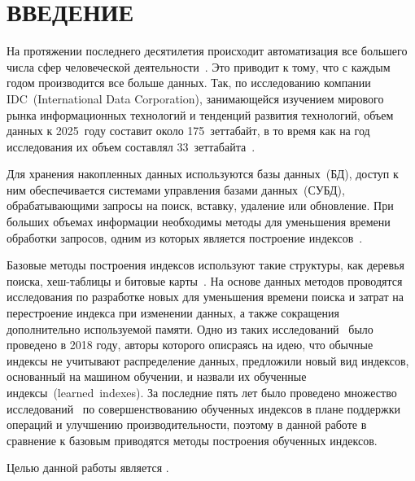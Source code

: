 \chapter*{ВВЕДЕНИЕ}

На протяжении последнего десятилетия происходит автоматизация все большего числа
сфер человеческой деятельности~\cite{koptenok}. Это приводит к тому, что с
каждым годом производится все больше данных. Так, по исследованию компании
IDC~(International Data Corporation), занимающейся изучением мирового рынка
информационных технологий и тенденций развития технологий, объем данных к
2025~году составит около 175~зеттабайт, в то время как на год исследования их
объем составлял 33~зеттабайта~\cite{idc}.

Для хранения накопленных данных используются базы данных~(БД), доступ к ним
обеспечивается системами управления базами данных~(СУБД), обрабатывающими
запросы на поиск, вставку, удаление или обновление. При больших объемах
информации необходимы методы для уменьшения времени обработки запросов, одним из
которых является построение индексов~\cite{bits}.

Базовые методы построения индексов используют такие структуры, как деревья
поиска, хеш-таблицы и битовые карты~\cite{dama}. На основе данных методов
проводятся исследования по разработке новых для уменьшения времени поиска и
затрат на перестроение индекса при изменении данных, а также сокращения
дополнительно используемой памяти. Одно из таких исследований~\cite{main} было
проведено в 2018 году, авторы которого описраясь на идею, что обычные индексы не
учитывают распределение данных, предложили новый вид индексов, основанный на
машином обучении, и назвали их обученные индексы~(learned~indexes). За последние
пять лет было проведено множество исследований~\cite{alex, apex, ulipp,
pgmi} по совершенствованию обученных индексов в плане поддержки операций и
улучшению производительности, поэтому в данной работе в сравнение к базовым
приводятся методы построения обученных индексов.


Целью данной работы является .

